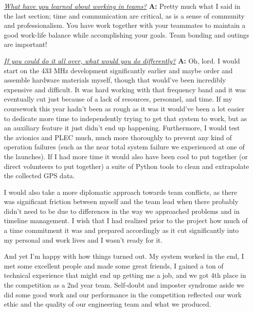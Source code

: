 \documentclass[onecolumn, draftclsnofoot, 10pt, compsoc]{IEEEtran}
\begin{document}
\textit{\underline{What have you learned about working in teams?}}
\newline\textbf{A:} Pretty much what I said in the last section; time and communication are critical, as is a sense of community and professionalism. You have work together with your teammates to maintain a good work-life balance while accomplishing your goals. Team bonding and outings are important! \newline 

\textit{\underline{If you could do it all over, what would you do differently?}}
\newline\textbf{A:} Oh, lord. I would start on the 433 MHz development significantly earlier and maybe order and assemble hardware materials myself, though that would've been incredibly expensive and difficult. It was hard working with that frequency band and it was eventually cut just because of a lack of resources, personnel, and time. If my coursework this year hadn't been as rough as it was it would've been a lot easier to dedicate more time to independently trying to get that system to work, but as an auxiliary feature it just didn't end up happening. Furthermore, I would test the avionics and PLEC much, much more thoroughly to prevent any kind of operation failures (such as the near total system failure we experienced at one of the launches). If I had more time it would also have been cool to put together (or direct volunteers to put together) a suite of Python tools to clean and extrapolate the collected GPS data. \newline

I would also take a more diplomatic approach towards team conflicts, as there was significant friction between myself and the team lead when there probably didn't need to be due to differences in the way we approached problems and in timeline management. I wish that I had realized prior to the project how much of a time commitment it was and prepared accordingly as it cut significantly into my personal and work lives and I wasn't ready for it. \newline

And yet I'm happy with how things turned out. My system worked in the end, I met some excellent people and made some great friends, I gained a ton of technical experience that might end up getting me a job, and we got 4th place in the competition as a 2nd year team. Self-doubt and imposter syndrome aside we did some good work and our performance in the competition reflected our work ethic and the quality of our engineering team and what we produced. \newline
\end{document}
